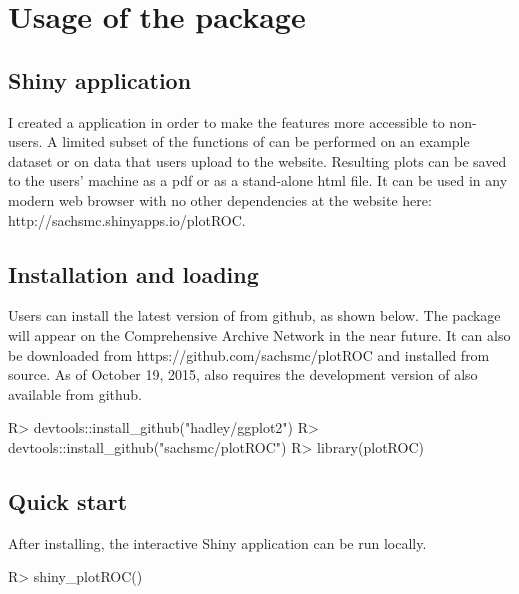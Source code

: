 \documentclass[codesnippet]{jss}
\begin{document}
\section{Usage of the package}\label{usage-of-the-package}

\subsection{Shiny application}\label{shiny-application}

I created a  application \citep{shiny} in order to make the
features more accessible to non- users. A limited subset of
the functions of  can be performed on an example dataset or
on data that users upload to the website. Resulting plots can be saved
to the users' machine as a pdf or as a stand-alone html file. It can be
used in any modern web browser with no other dependencies at the website
here: http://sachsmc.shinyapps.io/plotROC.

\subsection{Installation and loading}\label{installation-and-loading}

Users can install the latest version of  from github, as
shown below. The package will appear on the Comprehensive 
Archive Network in the near future. It can also be downloaded from
https://github.com/sachsmc/plotROC and installed from source. As of
October 19, 2015,  also requires the development version of
 also available from github.

\begin{Schunk}
\begin{Sinput}
R> devtools::install_github("hadley/ggplot2")
R> devtools::install_github("sachsmc/plotROC")
R> library(plotROC)
\end{Sinput}
\end{Schunk}

\subsection{Quick start}\label{quick-start}

After installing, the interactive Shiny application can be run locally.

\begin{Schunk}
\begin{Sinput}
R> shiny_plotROC()
\end{Sinput}
\end{Schunk}
\end{document}
